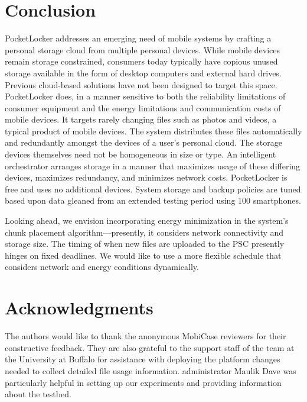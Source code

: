 
\section{Conclusion}
\label{sec-conclusion}

PocketLocker addresses an emerging need of mobile systems by crafting a
personal storage cloud from multiple personal devices.  While mobile devices
remain storage constrained, consumers today typically have copious unused
storage available in the form of desktop computers and external hard drives.
Previous cloud-based solutions have not been designed to target this space.
PocketLocker does, in a manner sensitive to both the reliability limitations of
consumer equipment and the energy limitations and communication costs of mobile
devices. It targets rarely changing files such as photos and videos, a typical
product of mobile devices.  The system distributes these files automatically
and redundantly amongst the devices of a user's personal cloud. The storage
devices themselves need not be homogeneous in size or type.  An intelligent
orchestrator arranges storage in a manner that maximizes usage of these
differing devices, maximizes redundancy, and minimizes network costs.
PocketLocker is free and uses no additional devices.  System storage and backup
policies are tuned based upon data gleaned from an extended testing period
using 100 smartphones.

Looking ahead, we envision incorporating energy minimization in the system's
chunk placement algorithm---presently, it considers network connectivity and
storage size.  The timing of when new files are uploaded to the PSC presently
hinges on fixed deadlines.  We would like to use a more flexible schedule that
considers network and energy conditions dynamically.

\section*{Acknowledgments}

The authors would like to thank the anonymous MobiCase reviewers for their
constructive feedback. They are also grateful to the support staff of the
\PhoneLab{} team at the University at Buffalo for assistance with deploying the
platform changes needed to collect detailed file usage information. \PhoneLab{}
administrator Maulik Dave was particularly helpful in setting up our
experiments and providing information about the testbed.



